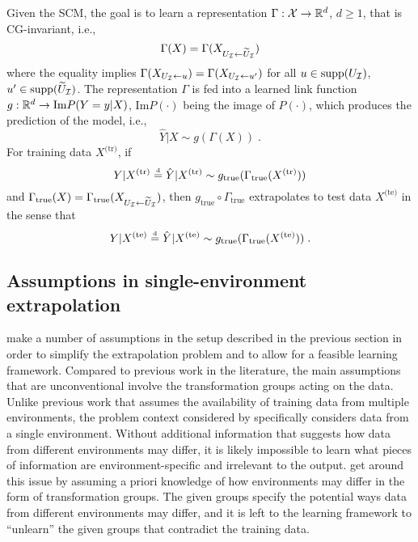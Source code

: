 Given the SCM, the goal is to learn a representation $\Gamma:\mathcal{X}\rightarrow\mathbb{R}^d$, $d\geq 1$, that is CG-invariant, i.e.,
\[
\Gamma(X) = \Gamma(X_{U_{\mathcal{I}}\leftarrow\widetilde{U}_{\mathcal{I}}})
\]
where the equality implies $\Gamma(X_{U_{\mathcal{I}}\leftarrow u})=\Gamma(X_{U_{\mathcal{I}}\leftarrow u'})$ for all $u\in\text{\rm supp}(U_{\mathcal{I}})$, $u'\in\text{\rm supp}(\widetilde{U}_{\mathcal{I}})$. The representation $\Gamma$ is fed into a learned link function $g:\mathbb{R}^d\rightarrow \text{Im} P(Y=y|X)$, $\text{Im} P(\cdot)$ being the image of $P(\cdot)$, which produces the prediction of the model, i.e.,
\[
\hat{Y}|X \sim g(\Gamma(X)) \;.
\]
For training data $X^\text{(tr)}$, if
\[
Y|X^\text{(tr)} \stackrel{\text{\rm\tiny d}}{=} \hat{Y}|X^\text{(tr)}\sim g_{\text{true}}(\Gamma_{\text{true}}(X^\text{(tr)}))
\]
and $\Gamma_\text{true}(X) = \Gamma_\text{true}(X_{U_{\mathcal{I}}\leftarrow\widetilde{U}_{\mathcal{I}}})$, then $g_\text{true}\circ\Gamma_\text{true}$ extrapolates to test data $X^\text{(te)}$ in the sense that
\[
Y|X^\text{(te)} \stackrel{\text{\rm\tiny d}}{=} \hat{Y}|X^\text{(te)}\sim g_{\text{true}}(\Gamma_{\text{true}}(X^\text{(te)})) \;.
\]


\subsection{Assumptions in single-environment extrapolation}

\textcite{Mouli:2021} make a number of assumptions in the setup described in the previous section in order to simplify the extrapolation problem and to allow for a feasible learning framework. Compared to previous work in the literature, the main assumptions that are unconventional involve the transformation groups acting on the data.
\\

Unlike previous work that assumes the availability of training data from multiple environments, the problem context considered by \citeauthor{Mouli:2021} specifically considers data from a single environment. Without additional information that suggests how data from different environments may differ, it is likely impossible to learn what pieces of information are environment-specific and irrelevant to the output. \citeauthor{Mouli:2021} get around this issue by assuming a priori knowledge of how environments may differ in the form of transformation groups. The given groups specify the potential ways data from different environments may differ, and it is left to the learning framework to ``unlearn'' the given groups that contradict the training data.
\\

